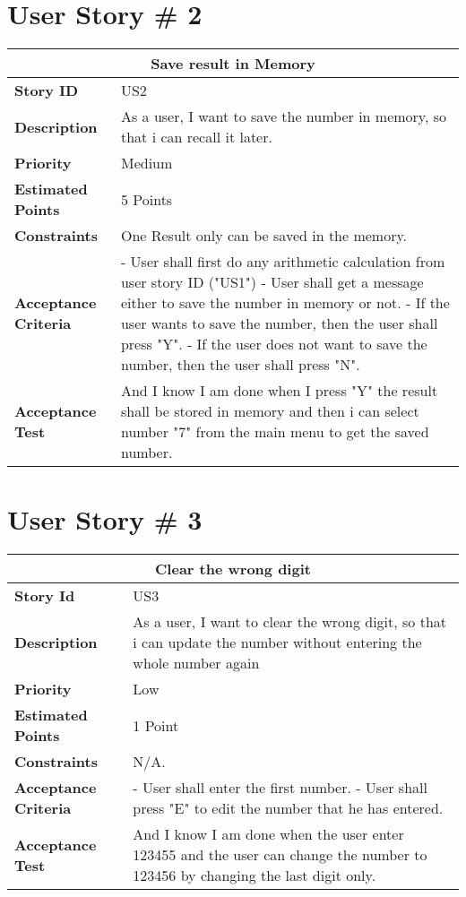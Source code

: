 \documentclass{report}
\begin{document}
\section{User Story \# 2}
\begin{tabular}{|p{3.5cm}|p{9cm}| }
\hline
\multicolumn{2}{|c|}{Save result in Memory} \\
\hline
\textbf {Story ID}& US2\\
\hline
\textbf{Description}& As a user, I want to save the number in memory, so that i can recall it later.\\
\hline
\textbf{Priority} & Medium \\
\hline
\textbf{Estimated Points} & 5 Points \\
\hline
\textbf{Constraints}& One Result only can be saved in the memory.\\
\hline
\textbf{Acceptance Criteria}& 

-   User shall first do any arithmetic calculation from user story ID ("US1") \newline
-   User shall get a message either to save the number in memory or not.\newline
-   If the user wants to save the number, then the user shall press "Y".\newline
-   If the user does not want to save the number, then the user shall press "N".\\
\hline
\textbf{Acceptance Test}& And I know I am done when I press "Y" the result shall be stored in memory and then i can select number "7" from the main menu to get the saved number.\\
\hline
\end{tabular}

\section{User Story \# 3}
\begin{tabular}{|p{3.5cm}|p{9cm}| }
\hline
\multicolumn{2}{|c|}{Clear the wrong digit} \\
\hline
\textbf {Story Id}& US3\\
\hline
\textbf{Description}& As a user, I want to clear the wrong digit, so that i can update the number without entering the whole number again\\
\hline
\textbf{Priority} & Low \\
\hline
\textbf{Estimated Points} & 1 Point \\
\hline
\textbf{Constraints}& N/A.\\
\hline
\textbf{Acceptance Criteria}&

-   User shall enter the first number.\newline
-   User shall press "E" to edit the number that he has entered.\\
\hline
\textbf{Acceptance Test}& And I know I am done when the user enter 123455 and the user can change the number to 123456 by changing the last digit only.\\
\hline
\end{tabular}
\end{document}
